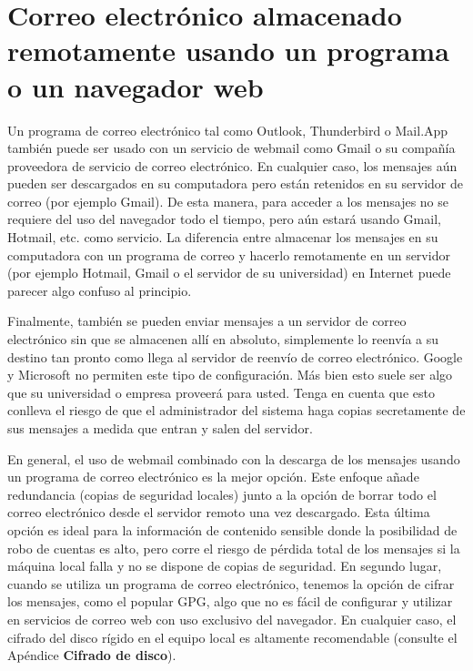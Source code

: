 \documentclass[10pt,a5paper,twoside,,]{book}
\begin{document}
\section{Correo electrónico almacenado remotamente usando un programa o
un navegador
web}\label{correo-electruxf3nico-almacenado-remotamente-usando-un-programa-o-un-navegador-web}

Un programa de correo electrónico tal como Outlook, Thunderbird o
Mail.App también puede ser usado con un servicio de webmail como Gmail o
su compañía proveedora de servicio de correo electrónico. En cualquier
caso, los mensajes aún pueden ser descargados en su computadora pero
están retenidos en su servidor de correo (por ejemplo Gmail). De esta
manera, para acceder a los mensajes no se requiere del uso del navegador
todo el tiempo, pero aún estará usando Gmail, Hotmail, etc. como
servicio. La diferencia entre almacenar los mensajes en su computadora
con un programa de correo y hacerlo remotamente en un servidor (por
ejemplo Hotmail, Gmail o el servidor de su universidad) en Internet
puede parecer algo confuso al principio.

Finalmente, también se pueden enviar mensajes a un servidor de correo
electrónico sin que se almacenen allí en absoluto, simplemente lo
reenvía a su destino tan pronto como llega al servidor de reenvío de
correo electrónico. Google y Microsoft no permiten este tipo de
configuración. Más bien esto suele ser algo que su universidad o empresa
proveerá para usted. Tenga en cuenta que esto conlleva el riesgo de que
el administrador del sistema haga copias secretamente de sus mensajes a
medida que entran y salen del servidor.

En general, el uso de webmail combinado con la descarga de los mensajes
usando un programa de correo electrónico es la mejor opción. Este
enfoque añade redundancia (copias de seguridad locales) junto a la
opción de borrar todo el correo electrónico desde el servidor remoto una
vez descargado. Esta última opción es ideal para la información de
contenido sensible donde la posibilidad de robo de cuentas es alto, pero
corre el riesgo de pérdida total de los mensajes si la máquina local
falla y no se dispone de copias de seguridad. En segundo lugar, cuando
se utiliza un programa de correo electrónico, tenemos la opción de
cifrar los mensajes, como el popular GPG, algo que no es fácil de
configurar y utilizar en servicios de correo web con uso exclusivo del
navegador. En cualquier caso, el cifrado del disco rígido en el equipo
local es altamente recomendable (consulte el Apéndice \textbf{Cifrado de
disco}).
\end{document}
